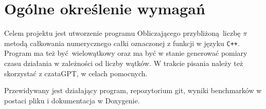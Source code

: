 	\newpage
\section{Ogólne określenie wymagań}		%

\hspace{0.60cm}

Celem projektu jest utworzenie programu Obliczającego przybliżoną liczbę $\pi$ metodą całkowania numerycznego całki oznaczonej z funkcji w języku \texttt{C++}. Program ma też być wielowątkowy oraz ma być w stanie generować pomiary czasu działania w zależności od liczby wątków. W trakcie pisania należy też skorzystać z czataGPT, w celach pomocnych.

Przewidywany jest działający program, repozytorium git, wyniki benchmarków w postaci pliku i dokumentacja w Doxygenie.
